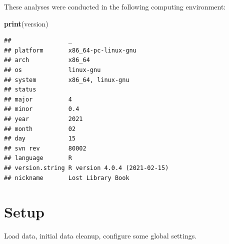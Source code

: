 \documentclass[]{book}
\newenvironment{Shaded}{\begin{snugshade}}{\end{snugshade}}
\newcommand{\KeywordTok}[1]{\textcolor[rgb]{0.13,0.29,0.53}{\textbf{#1}}}
\newcommand{\NormalTok}[1]{#1}
\begin{document}
These analyses were conducted in the following computing environment:

\begin{Shaded}
\begin{Highlighting}[]
\KeywordTok{print}\NormalTok{(version)}
\end{Highlighting}
\end{Shaded}

\begin{verbatim}
##                _                           
## platform       x86_64-pc-linux-gnu         
## arch           x86_64                      
## os             linux-gnu                   
## system         x86_64, linux-gnu           
## status                                     
## major          4                           
## minor          0.4                         
## year           2021                        
## month          02                          
## day            15                          
## svn rev        80002                       
## language       R                           
## version.string R version 4.0.4 (2021-02-15)
## nickname       Lost Library Book
\end{verbatim}

\hypertarget{setup-4}{%
\section{Setup}\label{setup-4}}

Load data, initial data cleanup, configure some global settings.
\end{document}
